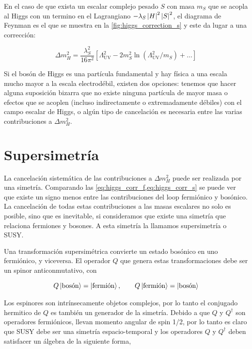 En el caso de que exista un escalar complejo pesado $S$ con masa $m_S$
que se acopla al Higgs con un termino en el Lagrangiano $-\lambda_S
\left| H \right|^2 \left| S \right|^2$, el diagrama de Feynman es el que se muestra en
la \cref{fig:higgs_correction_s} y este da lugar a una corrección:

\begin{equation}
  \Delta m_H^2 = \frac{\lambda_S^2}{16\pi^2} \left[
    \Lambda^2_\text{UV} - 2 m_S^2 \ln (\Lambda^2_\text{UV}/m_S) +
    \ldots \right]
  \label{eq:higgs_corr_s}
\end{equation}

Si el bosón de Higgs es una partícula fundamental y hay física a una
escala mucho mayor a la escala electrodébil, existen dos opciones:
tenemos que hacer alguna suposición bizarra que no existe ninguna
partícula de mayor masa o efectos que se acoplen (incluso
indirectamente o extremadamente débiles) con el campo escalar de
Higgs, o algún tipo de cancelación es necesaria entre las varias
contribuciones a $\Delta m_H^2$.

\section{Supersimetría}

La cancelación sistemática de las contribuciones a $\Delta m_H^2$
puede ser realizada por una simetría. Comparando las
\cref{eq:higgs_corr_f,eq:higgs_corr_s} se puede ver que existe un
signo menos entre las contribuciones del loop fermiónico y bosónico.
La cancelación de todas estas contribuciones a las masas escalares no
solo es posible, sino que es inevitable, si consideramos que existe
una simetría que relaciona fermiones y bosones. A esta simetría la
llamamos supersimetría o SUSY.

Una transformación supersimétrica convierte un estado bosónico en uno
fermiónico, y viceversa. El operador $Q$ que genera estas
transformaciones debe ser un spinor anticonmutativo, con

\begin{equation}
  Q \left| \text{bosón} \right> = \left| \text{fermión} \right>, \quad \quad Q
  \left| \text{fermión} \right> = \left| \text{bosón} \right>
\end{equation}

Los espinores son intrínsecamente objetos complejos, por lo tanto el
conjugado hermitico de $Q$ es también un generador de la simetría.
Debido a que $Q$ y $Q^\dagger$ son operadores fermiónicos, llevan
momento angular de spin 1/2, por lo tanto es claro que SUSY debe ser
una simetría espacio-temporal y los operadores $Q$ y $Q^\dagger$ deben
satisfacer un álgebra de la siguiente forma,

